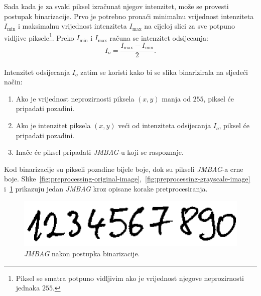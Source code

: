 Sada kada je za svaki piksel izračunat njegov intenzitet, može se provesti postupak binarizacije. Prvo je potrebno
pronaći minimalnu vrijednost intenziteta $I_{\min}$ i maksimalnu vrijednost intenziteta $I_{\max}$ na cijeloj slici za
sve potpuno vidljive piksele\footnote{Piksel se smatra potpuno vidljivim ako je vrijednost njegove neprozirnosti
jednaka $255$.}. Preko $I_{\min}$ i $I_{\max}$ računa se intenzitet odsijecanja:\\
\begin{equation*}
    I_{o} = \frac{I_{\max} - I_{\min}}{2}.
\end{equation*}\\
Intenzitet odsijecanja $I_{o}$ zatim se koristi kako bi se slika binarizirala na sljedeći način:
\begin{enumerate}
    \item Ako je vrijednost neprozirnosti piksela $(x, y)$ manja od $255$, piksel će pripadati pozadini.
    \item Ako je intenzitet piksela $(x, y)$ veći od intenziteta odsijecanja $I_{o}$, piksel će pripadati pozadini.
    \item Inače će piksel pripadati \emph{JMBAG}-u koji se raspoznaje.
\end{enumerate}
Kod binarizacije su pikseli pozadine bijele boje, dok su pikseli \emph{JMBAG}-a crne boje.
Slike\ \ref{fig:preprocessing-original-image},\ \ref{fig:preprocessing-grayscale-image}
i\ \ref{fig:preprocessing-binarized-image} prikazuju jedan \emph{JMBAG} kroz opisane korake pretprocesiranja.
\begin{figure}[htb]
    \centering
    \includegraphics[width=12cm]{images/preprocessing-binarized-image.png}
    \caption{\emph{JMBAG} nakon postupka binarizacije.}
    \label{fig:preprocessing-binarized-image}
\end{figure}


